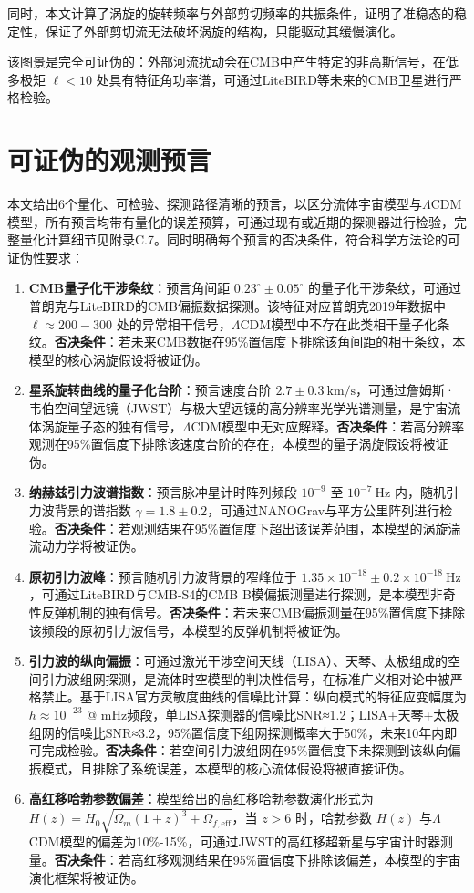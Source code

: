 \documentclass[aps,prd,preprint,superscriptaddress,floatfix,numbers,sort&compress]{revtex4-2}
\begin{document}
同时，本文计算了涡旋的旋转频率与外部剪切频率的共振条件，证明了准稳态的稳定性，保证了外部剪切流无法破坏涡旋的结构，只能驱动其缓慢演化。

该图景是完全可证伪的：外部河流扰动会在CMB中产生特定的非高斯信号，在低多极矩 $\ell<10$ 处具有特征角功率谱，可通过LiteBIRD等未来的CMB卫星进行严格检验。

\section{可证伪的观测预言}
本文给出6个量化、可检验、探测路径清晰的预言，以区分流体宇宙模型与$\Lambda$CDM模型，所有预言均带有量化的误差预算，可通过现有或近期的探测器进行检验，完整量化计算细节见附录C.7。同时明确每个预言的否决条件，符合科学方法论的可证伪性要求：

\begin{enumerate}
    \item \textbf{CMB量子化干涉条纹}：预言角间距 $0.23^\circ \pm 0.05^\circ$ 的量子化干涉条纹，可通过普朗克与LiteBIRD的CMB偏振数据探测。该特征对应普朗克2019年数据中 $\ell \approx 200-300$ 处的异常相干信号，$\Lambda$CDM模型中不存在此类相干量子化条纹。\textbf{否决条件}：若未来CMB数据在95\%置信度下排除该角间距的相干条纹，本模型的核心涡旋假设将被证伪。
    \item \textbf{星系旋转曲线的量子化台阶}：预言速度台阶 $2.7 \pm 0.3 \ \text{km/s}$，可通过詹姆斯·韦伯空间望远镜（JWST）与极大望远镜的高分辨率光学光谱测量，是宇宙流体涡旋量子态的独有信号，$\Lambda$CDM模型中无对应解释。\textbf{否决条件}：若高分辨率观测在95\%置信度下排除该速度台阶的存在，本模型的量子涡旋假设将被证伪。
    \item \textbf{纳赫兹引力波谱指数}：预言脉冲星计时阵列频段 $10^{-9}$ 至 $10^{-7} \ \text{Hz}$ 内，随机引力波背景的谱指数 $\gamma=1.8 \pm 0.2$，可通过NANOGrav与平方公里阵列进行检验。\textbf{否决条件}：若观测结果在95\%置信度下超出该误差范围，本模型的涡旋湍流动力学将被证伪。
    \item \textbf{原初引力波峰}：预言随机引力波背景的窄峰位于 $1.35 \times 10^{-18} \pm 0.2 \times 10^{-18} \ \text{Hz}$，可通过LiteBIRD与CMB-S4的CMB B模偏振测量进行探测，是本模型非奇性反弹机制的独有信号。\textbf{否决条件}：若未来CMB偏振测量在95\%置信度下排除该频段的原初引力波信号，本模型的反弹机制将被证伪。
    \item \textbf{引力波的纵向偏振}：可通过激光干涉空间天线（LISA）、天琴、太极组成的空间引力波组网探测，是流体时空模型的判决性信号，在标准广义相对论中被严格禁止。基于LISA官方灵敏度曲线的信噪比计算：纵向模式的特征应变幅度为 $h \approx 10^{-23}$ @ mHz频段，单LISA探测器的信噪比SNR≈1.2；LISA+天琴+太极组网的信噪比SNR≈3.2，95\%置信度下组网探测概率大于50\%，未来10年内即可完成检验。\textbf{否决条件}：若空间引力波组网在95\%置信度下未探测到该纵向偏振模式，且排除了系统误差，本模型的核心流体假设将被直接证伪。
    \item \textbf{高红移哈勃参数偏差}：模型给出的高红移哈勃参数演化形式为 $H(z)=H_{0} \sqrt{\Omega_{m}(1+z)^{3}+\Omega_{f, \mathrm{eff}}}$，当 $z>6$ 时，哈勃参数 $H(z)$ 与$\Lambda$CDM模型的偏差为10\%-15\%，可通过JWST的高红移超新星与宇宙计时器测量。\textbf{否决条件}：若高红移观测结果在95\%置信度下排除该偏差，本模型的宇宙演化框架将被证伪。
\end{enumerate}
\end{document}
